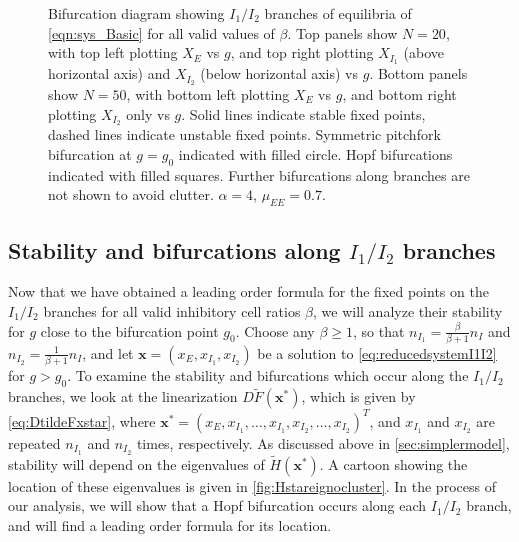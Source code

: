 \documentclass[reqno]{siamonline190516}
\newcommand{\xvec}{\mathbf{x}}
\begin{document}
\begin{figure}
\begin{tabular}{cc}
    \end{tabular}
    \caption{Bifurcation diagram showing $I_1/I_2$ branches of equilibria of \cref{eqn:sys_Basic} for all valid values of $\beta$. Top panels show $N=20$, with top left plotting $X_E$ vs $g$, and top right plotting $X_{I_1}$ (above horizontal axis) and $X_{I_2}$ (below horizontal axis) vs $g$. Bottom panels show $N=50$, with bottom left plotting $X_E$ vs $g$, and bottom right plotting $X_{I_2}$ only vs $g$. Solid lines indicate stable fixed points, dashed lines indicate unstable fixed points. Symmetric pitchfork bifurcation at $g = g_0$ indicated with filled circle. Hopf bifurcations indicated with filled squares. Further bifurcations along branches are not shown to avoid clutter. $\alpha = 4$, $\mu_{EE} = 0.7$.}
    \label{fig:noclusterBD1}
\end{figure}

\subsection{Stability and bifurcations along \texorpdfstring{$I_1/I_2$}{I1/I2} branches}\label{sec:I1I2stability}

Now that we have obtained a leading order formula for the fixed points on the $I_1/I_2$ branches for all valid inhibitory cell ratios $\beta$, we will analyze their stability for $g$ close to the bifurcation point $g_0$. Choose any $\beta \geq 1$, so that $n_{I_1} = \frac{\beta}{\beta+1}n_I$ and $n_{I_2} = \frac{1}{\beta+1}n_I$, and let $\xvec = (x_E, x_{I_1}, x_{I_2})$ be a solution to \cref{eq:reducedsystemI1I2} for $g > g_0$. To examine the stability and bifurcations which occur along the $I_1/I_2$ branches, we look at the linearization $D\tilde{F}(\xvec^*)$, which is given by \cref{eq:DtildeFxstar}, where $\xvec^* = (x_E, x_{I_1}, \dots, x_{I_1}, x_{I_2}, \dots, x_{I_2})^T$, and $x_{I_1}$ and $x_{I_2}$ are repeated $n_{I_1}$ and $n_{I_2}$ times, respectively. As discussed above in \cref{sec:simplermodel}, stability will depend on the eigenvalues of $\tilde{H}(\xvec^*)$. A cartoon showing the location of these eigenvalues is given in \cref{fig:Hstareignocluster}. In the process of our analysis, we will show that a Hopf bifurcation occurs along each $I_1/I_2$ branch, and will find a leading order formula for its location.
\end{document}
